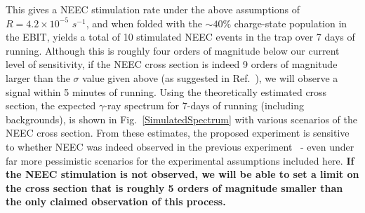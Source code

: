 \documentclass[12pt]{article}
\begin{document}
This gives a NEEC stimulation rate under the above assumptions of $R = 4.2\times10^{-5}$ $s^{-1}$, and when folded with the $\sim40\%$ charge-state population in the EBIT, yields a total of 10 stimulated NEEC events in the trap over 7 days of running.  Although this is roughly four orders of magnitude below our current level of sensitivity, if the NEEC cross section is indeed 9 orders of magnitude larger than the $\sigma$ value given above (as suggested in Ref.~\cite{Chi18}), we will observe a signal within 5 minutes of running.  Using the theoretically estimated cross section, the expected $\gamma$-ray spectrum for 7-days of running (including backgrounds), is shown in Fig.~\ref{SimulatedSpectrum} with various scenarios of the NEEC cross section.  From these estimates, the proposed experiment is sensitive to whether NEEC was indeed observed in the previous experiment~\cite{Chi18} - even under far more pessimistic scenarios for the experimental assumptions included here.  \textbf{If the NEEC stimulation is not observed, we will be able to set a limit on the cross section that is roughly 5 orders of magnitude smaller than the only claimed observation of this process.}

\end{document}
